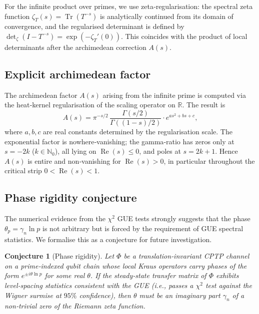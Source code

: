 \documentclass[11pt,a4paper]{article}
\newtheorem{conjecture}{Conjecture}
\begin{document}
For the infinite product over primes, we use zeta‑regularisation: the spectral zeta function $\zeta_T(s) = \operatorname{Tr}(T^{-s})$ is analytically continued from its domain of convergence, and the regularised determinant is defined by $\det_{\zeta}(I-T^{-s}) = \exp(-\zeta_T'(0))$.  This coincides with the product of local determinants after the archimedean correction $A(s)$.

\subsection{Explicit archimedean factor}
\label{app:A-explicit}

The archimedean factor $A(s)$ arising from the infinite prime is computed via the heat‑kernel regularisation of the scaling operator on $\mathbb{R}$.  The result is
\begin{equation}\label{eq:A-explicit}
A(s) = \pi^{-s/2}\, \frac{\Gamma(s/2)}{\Gamma((1-s)/2)} \cdot e^{a s^2 + b s + c},
\end{equation}
where $a,b,c$ are real constants determined by the regularisation scale.  The exponential factor is nowhere‑vanishing; the gamma‑ratio has zeros only at $s = -2k$ ($k\in\mathbb{N}_0$), all lying on $\operatorname{Re}(s) \le 0$, and poles at $s = 2k+1$.  Hence $A(s)$ is entire and non‑vanishing for $\operatorname{Re}(s) > 0$, in particular throughout the critical strip $0 < \operatorname{Re}(s) < 1$.

\subsection{Phase rigidity conjecture}
\label{app:rigidity}

The numerical evidence from the $\chi^2$ GUE tests strongly suggests that the phase $\theta_p = \gamma_n \ln p$ is not arbitrary but is forced by the requirement of GUE spectral statistics.  We formalise this as a conjecture for future investigation.

\begin{conjecture}[Phase rigidity]\label{conj:rigidity}
Let $\Phi$ be a translation‑invariant CPTP channel on a prime‑indexed qubit chain whose local Kraus operators carry phases of the form $e^{\pm i \theta \ln p}$ for some real $\theta$.  If the steady‑state transfer matrix of $\Phi$ exhibits level‑spacing statistics consistent with the GUE (i.e., passes a $\chi^2$ test against the Wigner surmise at $95\%$ confidence), then $\theta$ must be an imaginary part $\gamma_n$ of a non‑trivial zero of the Riemann zeta function.
\end{conjecture}
\end{document}
